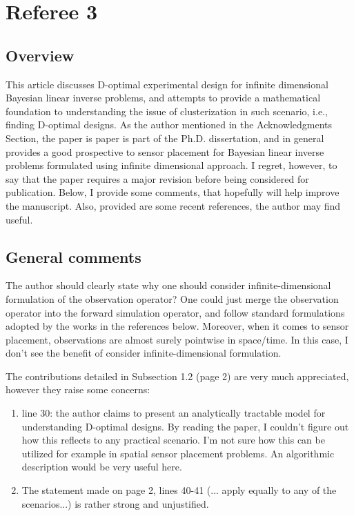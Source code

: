 \documentclass{amsart}
\begin{document}
\section{Referee 3}

\subsection{Overview}

This article discusses D-optimal experimental design for infinite
dimensional Bayesian linear inverse problems, and attempts to provide
a mathematical foundation to understanding the issue of clusterization
in such scenario, i.e., finding D-optimal designs.  As the author
mentioned in the Acknowledgments Section, the paper is paper is part
of the Ph.D. dissertation, and in general provides a good prospective
to sensor placement for Bayesian linear inverse problems formulated
using infinite dimensional approach.  I regret, however, to say that
the paper requires a major revision before being considered for
publication.  Below, I provide some comments, that hopefully will help
improve the manuscript.  Also, provided are some recent references,
the author may find useful.


\subsection{General comments}

The author should clearly state why one should consider
infinite-dimensional formulation of the observation operator? One
could just merge the observation operator into the forward simulation
operator, and follow standard formulations adopted by the works in the
references below. Moreover, when it comes to sensor placement,
observations are almost surely pointwise in space/time. In this case,
I don't see the benefit of consider infinite-dimensional formulation.


The contributions detailed in Subsection 1.2 (page 2) are very much
appreciated, however they raise some concerns:

\begin{enumerate}
\item line 30: the author claims to present an analytically tractable
  model for understanding D-optimal designs. By reading the paper, I
  couldn't figure out how this reflects to any practical scenario. I'm
  not sure how this can be utilized for example in spatial sensor
  placement problems. An algorithmic description would be very useful
  here.


\item The statement made on page 2, lines 40-41 (... apply equally to
  any of the scenarios...) is rather strong and unjustified.
\end{enumerate}
\end{document}
